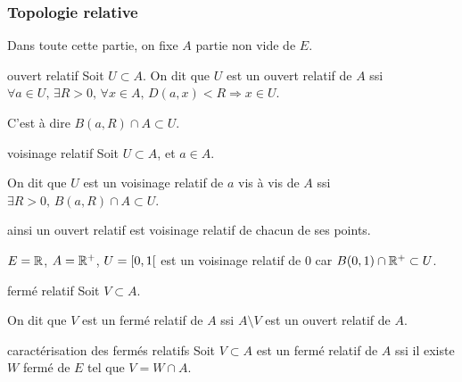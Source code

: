\subsubsection{Topologie relative}

Dans toute cette partie, on fixe $A$ partie non vide de $E$.

\begin{definition}{ouvert relatif}{}
    Soit $U \subset A$. On dit que $U$ est un ouvert relatif de $A$ 
    ssi $\forall a \in U, \, \exists R > 0, \, \forall x \in A, \, D(a, x) < R \Rightarrow x \in U$.

    C'est à dire $B(a, R) \cap A \subset U$.
 
\end{definition}

\begin{definition}{voisinage relatif}{}
    Soit $U \subset A$, et $a \in A$. 

    On dit que $U$ est un voisinage relatif de $a$ vis à vis de $A$ ssi 
    $\exists R > 0, \, B(a, R) \cap A \subset U$.

    ainsi un ouvert relatif est voisinage relatif de chacun de ses points.
\end{definition}

\begin{exemple}
    $E = \mathbb{R}$, $A = \mathbb{R}^+$, $U = \left[0, 1\right[$ est un voisinage relatif de $0$ 
    car $B(0, 1) \cap \mathbb{R}^+ \subset U$. 
\end{exemple}


\begin{definition}{fermé relatif}{}
    Soit $V \subset A$. 

    On dit que $V$ est un fermé relatif de $A$ ssi $A \setminus V$ est un ouvert relatif de $A$.
\end{definition}


\begin{proposition}{caractérisation des fermés relatifs}{}
    Soit $V \subset A$ est un fermé relatif de $A$ ssi il existe $W$ fermé de $E$ tel que $V = W \cap A$.
\end{proposition}


